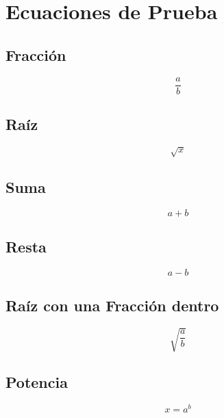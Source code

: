 \documentclass{article}
\begin{document}
\section*{Ecuaciones de Prueba}

\subsection*{Fracción}
\[
\frac{a}{b}
\]

\subsection*{Raíz}
\[
\sqrt{x}
\]

\subsection*{Suma}
\[
a + b
\]

\subsection*{Resta}

$$a - b$$

\subsection*{Raíz con una Fracción dentro}
\[
\sqrt{\frac{a}{b}}
\]

\subsection*{Potencia}
\[
x = a^b
\]
\end{document}
